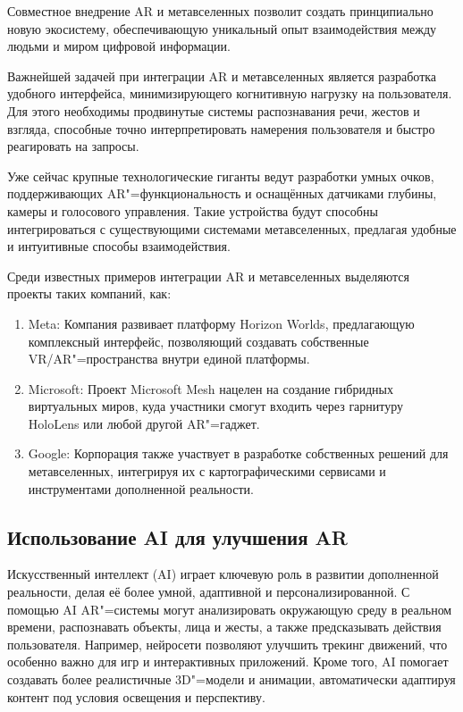 Совместное внедрение AR и метавселенных позволит создать принципиально новую экосистему, обеспечивающую уникальный опыт взаимодействия между людьми и миром цифровой информации.

Важнейшей задачей при интеграции AR и метавселенных является разработка удобного интерфейса, минимизирующего когнитивную нагрузку на пользователя. Для этого необходимы продвинутые системы распознавания речи, жестов и взгляда, способные точно интерпретировать намерения пользователя и быстро реагировать на запросы.

Уже сейчас крупные технологические гиганты ведут разработки умных очков, поддерживающих AR"=функциональность и оснащённых датчиками глубины, камеры и голосового управления. Такие устройства будут способны интегрироваться с существующими системами метавселенных, предлагая удобные и интуитивные способы взаимодействия.

Среди известных примеров интеграции AR и метавселенных выделяются проекты таких компаний, как:
\begin{enumerate}
    \item Meta: Компания развивает платформу Horizon Worlds, предлагающую комплексный интерфейс, позволяющий создавать собственные VR/AR"=пространства внутри единой платформы.
    \item Microsoft: Проект Microsoft Mesh нацелен на создание гибридных виртуальных миров, куда участники смогут входить через гарнитуру HoloLens или любой другой AR"=гаджет.
    \item Google: Корпорация также участвует в разработке собственных решений для метавселенных, интегрируя их с картографическими сервисами и инструментами дополненной реальности.
\end{enumerate}

\subsection{Использование AI для улучшения AR}
Искусственный интеллект (AI) играет ключевую роль в развитии дополненной реальности, делая её более умной, адаптивной и персонализированной. С помощью AI AR"=системы могут анализировать окружающую среду в реальном времени, распознавать объекты, лица и жесты, а также предсказывать действия пользователя. Например, нейросети позволяют улучшить трекинг движений, что особенно важно для игр и интерактивных приложений. Кроме того, AI помогает создавать более реалистичные 3D"=модели и анимации, автоматически адаптируя контент под условия освещения и перспективу.

